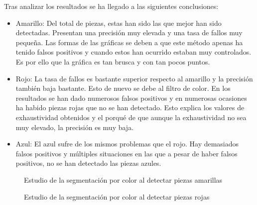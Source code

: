 Tras analizar los resultados se ha llegado a las siguientes conclusiones:
\begin{itemize}
\item Amarillo: Del total de piezas, estas han sido las que mejor han sido detectadas. Presentan una precisión muy elevada y una tasa de fallos muy pequeña. Las formas de las gráficas se deben a que este método apenas ha tenido falsos positivos y cuando estos han ocurrido estaban muy controlados. Es por ello que la gráfica es tan brusca y con tan pocos puntos.
\item Rojo: La tasa de fallos es bastante superior respecto al amarillo y la precisión también baja bastante. Esto de nuevo se debe al filtro de color. En los resultados se han dado numerosos falsos positivos y en numerosas ocasiones ha habido piezas rojas que no se han detectado. Esto explica los valores de exhaustividad obtenidos y el porqué de que aunque la exhaustividad no sea muy elevado, la precisión es muy baja.
\item Azul: El azul sufre de los mismos problemas que el rojo. Hay demasiados falsos positivos y múltiples situaciones en las que a pesar de haber falsos positivos, no se han detectado las piezas azules.
\end{itemize}

\begin{figure}[ht]  %
  \hfill	
\caption{Estudio de la segmentación por color al detectar piezas amarillas}
\label{fig:yellow colour}
\vspace{-5pt}
\end{figure}

\begin{figure}[ht]  %
  \hfill	
\caption{Estudio de la segmentación por color al detectar piezas rojas}
\label{fig:red colour}
\vspace{-5pt}
\end{figure}

